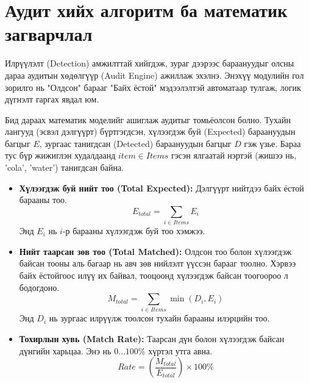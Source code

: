 \section{Аудит хийх алгоритм ба математик загварчлал}
Илрүүлэлт (Detection) амжилттай хийгдэж, зураг дээрээс бараануудыг олсны дараа аудитын хөдөлгүүр (Audit Engine) ажиллаж эхэлнэ. Энэхүү модулийн гол зорилго нь "Олдсон" барааг "Байх ёстой" мэдээлэлтэй автоматаар тулгаж, логик дүгнэлт гаргах явдал юм.

Бид дараах математик моделийг ашиглаж аудитыг томьёолсон болно.
Тухайн лангууд (эсвэл дэлгүүрт) бүртгэгдсэн, хүлээгдэж буй (Expected) бараануудын багцыг $E$, зургаас танигдсан (Detected) бараануудын багцыг $D$ гэж үзье.
Бараа тус бүр жижиглэн худалдаанд $item \in Items$ гэсэн ялгаатай нэртэй (жишээ нь, 'cola', 'water') танигдсан байна.

\begin{itemize}
    \item \textbf{Хүлээгдэж буй нийт тоо (Total Expected):} Дэлгүүрт нийтдээ байх ёстой барааны тоо.
    \begin{equation}
        E_{total} = \sum_{i \in Items} E_i
    \end{equation}
    Энд $E_i$ нь $i$-р барааны хүлээгдэж буй тоо хэмжээ.
    \item \textbf{Нийт таарсан зөв тоо (Total Matched):} Олдсон тоо болон хүлээгдэж байсан тооны аль багаар нь авч зөв нийлэлт үүссэн барааг тоолно. Хэрвээ байх ёстойгоос илүү их байвал, тооцоонд хүлээгдэж байсан тоогоороо л бодогдоно.
    \begin{equation}
        M_{total} = \sum_{i \in Items} \min(D_i, E_i)
    \end{equation}
    Энд $D_i$ нь зургаас илрүүлж тоолсон тухайн барааны илэрцийн тоо.
    \item \textbf{Тохирлын хувь (Match Rate):} Таарсан дүн болон хүлээгдэж байсан дүнгийн харьцаа. Энэ нь $0 \ldots 100\%$ хүртэл утга авна.
    \begin{equation}
        Rate = \left( \frac{M_{total}}{E_{total}} \right) \times 100\%
    \end{equation}
\end{itemize}

